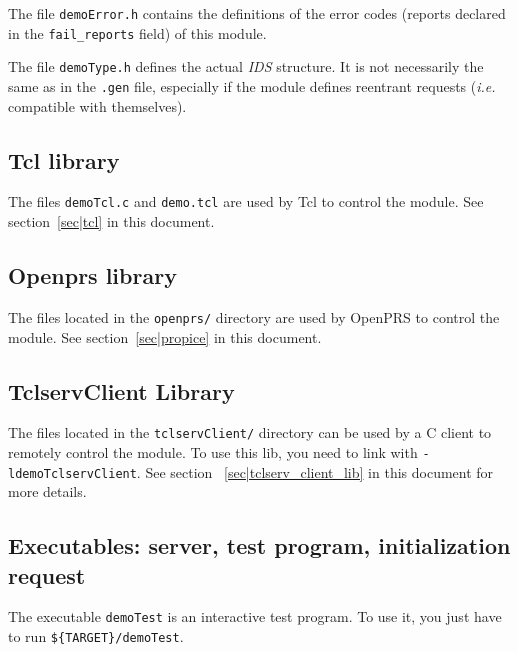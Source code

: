 The file  \texttt{demoError.h} contains the  definitions of the  error codes
(reports declared in the \texttt{fail\_reports} field) of this module.

The file \texttt{demoType.h} defines the actual \emph{IDS} structure. It is
not necessarily the same as  in the  \texttt{.gen}  file, especially if  the
module   defines   reentrant   requests   (\emph{i.e.}   compatible  with
themselves).

\subsection{Tcl library}

The files  \texttt{demoTcl.c} and \texttt{demo.tcl}  are used by Tcl to control
the module. See section~\ref{sec|tcl} in this document.


\subsection{Openprs library}

The files located in the \texttt{openprs/} directory are  used by OpenPRS to
control the module. See section~\ref{sec|propice} in this document.


\subsection{TclservClient Library}

The files located in the \texttt{tclservClient/} directory can be used by a C
client to remotely control the module. To use this lib, you need to link with 
\texttt{-ldemoTclservClient}. See section ~\ref{sec|tclserv_client_lib}
in this document for more details.

\subsection{Executables: server, test program, initialization request}

The executable \texttt{demoTest} is an interactive test program. To use it,
you just have to  run
\texttt{\$\{TARGET\}/demoTest}.

